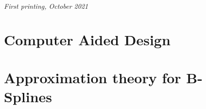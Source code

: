 \documentclass[11pt,fleqn]{book} %
\begin{document}
\noindent \textit{First printing, October 2021} %




\usechapterimagefalse %


\pagestyle{empty} %

\tableofcontents %

\cleardoublepage %

\pagestyle{fancy} %

\part{Computer Aided Design}


\part{Approximation theory for B-Splines}



\end{document}
